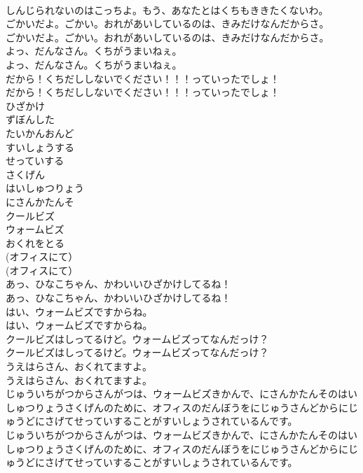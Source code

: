 \documentclass[8pt]{extreport}
\begin{document}
\begin{CJK}{UTF8}{min}
\\	しんじられないのはこっちよ。もう、あなたとはくちもききたくないわ。 
\\	ごかいだよ。ごかい。おれがあいしているのは、きみだけなんだからさ。	
\\	ごかいだよ。ごかい。おれがあいしているのは、きみだけなんだからさ。 
\\	よっ、だんなさん。くちがうまいねぇ。	
\\	よっ、だんなさん。くちがうまいねぇ。 
\\	だから！くちだししないでください！！！っていったでしょ！	
\\	だから！くちだししないでください！！！っていったでしょ！ 
\\	ひざかけ
\\	ずぼんした
\\	たいかんおんど
\\	すいしょうする
\\	せっていする
\\	さくげん
\\	はいしゅつりょう
\\	にさんかたんそ
\\	クールビズ
\\	ウォームビズ
\\	おくれをとる
\\	(オフィスにて）	
\\	(オフィスにて） 
\\	あっ、ひなこちゃん、かわいいひざかけしてるね！	
\\	あっ、ひなこちゃん、かわいいひざかけしてるね！ 
\\	はい、ウォームビズですからね。	
\\	はい、ウォームビズですからね。 
\\	クールビズはしってるけど。ウォームビズってなんだっけ？	
\\	クールビズはしってるけど。ウォームビズってなんだっけ？ 
\\	うえはらさん、おくれてますよ。	
\\	うえはらさん、おくれてますよ。 
\\	じゅういちがつからさんがつは、ウォームビズきかんで、にさんかたんそのはいしゅつりょうさくげんのために、オフィスのだんぼうをにじゅうさんどからにじゅうどにさげてせっていすることがすいしょうされているんです。	
\\	じゅういちがつからさんがつは、ウォームビズきかんで、にさんかたんそのはいしゅつりょうさくげんのために、オフィスのだんぼうをにじゅうさんどからにじゅうどにさげてせっていすることがすいしょうされているんです。 

\end{CJK}
\end{document}
